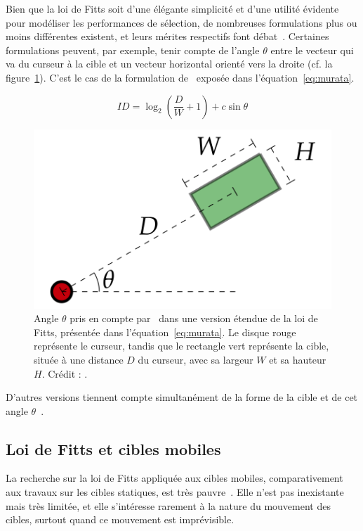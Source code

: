 	Bien que la loi de Fitts soit d'une élégante simplicité et d'une utilité évidente pour modéliser les performances de sélection, de nombreuses formulations plus ou moins différentes existent, et leurs mérites respectifs font débat~\cite{casallas2015prediction}. Certaines formulations peuvent, par exemple, tenir compte de l'angle $\theta$ entre le vecteur qui va du curseur à la cible et un vecteur horizontal orienté vers la droite (cf. la figure~\ref{fig:theta}). C'est le cas de la formulation de~\cite{murata2001extending} exposée dans l'équation~\ref{eq:murata}.
	
	\begin{equation}
		\label{eq:murata}
		ID = \log_2\left(\frac{D}{W} + 1\right) + c \sin \theta
	\end{equation}
	
	\begin{figure}[ht]
		\centering
		\includegraphics[width=\textwidth]{figures/ch2/theta}
		\caption[Fitts et $\theta$]{Angle $\theta$ pris en compte par~\cite{murata2001extending} dans une version étendue de la loi de Fitts, présentée dans l'équation~\ref{eq:murata}. Le disque rouge représente le curseur, tandis que le rectangle vert représente la cible, située à une distance $D$ du curseur, avec sa largeur $W$ et sa hauteur $H$. Crédit : \cite{casallas2015prediction}.}
		\label{fig:theta}
	\end{figure}
	
	D'autres versions tiennent compte simultanément de la forme de la cible et de cet angle $\theta$~\cite{appert2008evaluation, grossman2004pointing}.
	
	\subsection{Loi de Fitts et cibles mobiles}
	La recherche sur la loi de Fitts appliquée aux cibles mobiles, comparativement aux travaux sur les cibles statiques, est très pauvre~\cite{casallas2015prediction}. Elle n'est pas inexistante~\cite{jagacinski1980test, hoffmann1991capture, hajri2011moving} mais très limitée, et elle s'intéresse rarement à la nature du mouvement des cibles, surtout quand ce mouvement est imprévisible.
	
